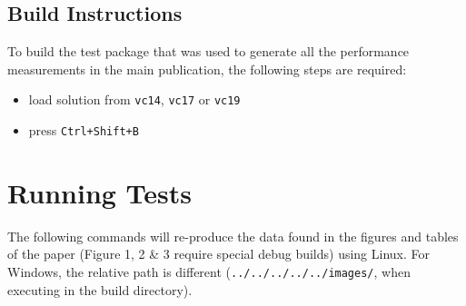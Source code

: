 \documentclass[format=acmsmall,review=false, screen=true]{acmart}
\begin{document}
\subsection{Build Instructions}
To build the test package that was used to generate all the performance measurements in the main publication, the following steps are required:
\begin{itemize}
\item load solution from \texttt{vc14}, \texttt{vc17} or \texttt{vc19}
\item press \texttt{Ctrl+Shift+B}
\end{itemize}

\section{Running Tests}
The following commands will re-produce the data found in the figures and tables of the paper (Figure 1, 2 \& 3 require special debug builds) using Linux. For Windows, the relative path is different (\texttt{../../../../../images/}, when executing in the build directory).
\end{document}
